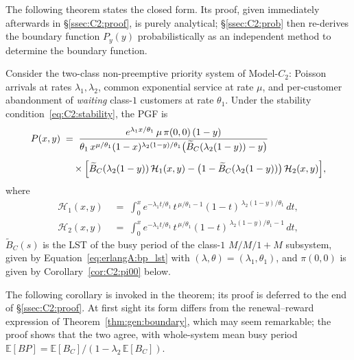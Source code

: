 The following theorem states the closed form. Its proof, given immediately afterwards in \S\ref{ssec:C2:proof}, is purely analytical; \S\ref{ssec:C2:prob} then re-derives the boundary function $P_y(y)$ probabilistically as an independent method to determine the boundary function.
\begin{theorem}\label{thm:C2:PGF}
    Consider the two-class non-preemptive priority system of Model-$C_2$: Poisson arrivals at rates $\lambda_1,\lambda_2$, common exponential service at rate $\mu$, and per-customer abandonment of \emph{waiting} class-$1$ customers at rate $\theta_1$. Under the stability condition~\eqref{eq:C2:stability}, the PGF is
    \begin{align*}
        \begin{split}
            P(x,y) \;&=\; \frac{e^{\lambda_1 x/\theta_1}\,\mu\,\pi(0,0)\,(1-y)}{\theta_1\, x^{\mu/\theta_1}(1-x)^{\lambda_2(1-y)/\theta_1}\bigl(\widetilde{B}_C(\lambda_2(1-y))-y\bigr)}\\[4pt]
            &\quad\times \Bigl[\widetilde{B}_C(\lambda_2(1-y))\,\mathcal{H}_1(x,y) - \bigl(1-\widetilde{B}_C(\lambda_2(1-y))\bigr)\,\mathcal{H}_2(x,y)\Bigr],
        \end{split}
    \end{align*}
    where
    \begin{align*}
        \mathcal{H}_1(x,y) &\;=\; \int_0^x e^{-\lambda_1 t/\theta_1}\,t^{\,\mu/\theta_1-1}(1-t)^{\,\lambda_2(1-y)/\theta_1}\,dt, \\
        \mathcal{H}_2(x,y) &\;=\; \int_0^x e^{-\lambda_1 t/\theta_1}\,t^{\,\mu/\theta_1}(1-t)^{\,\lambda_2(1-y)/\theta_1-1}\,dt,
    \end{align*}
    $\widetilde{B}_C(s)$ is the LST of the busy period of the class-$1$ $M/M/1{+}M$ subsystem, given by Equation~\eqref{eq:erlangA:bp_lst} with $(\lambda,\theta)=(\lambda_1,\theta_1)$, and $\pi(0,0)$ is given by Corollary~\ref{cor:C2:pi00} below.
\end{theorem}
The following corollary is invoked in the theorem; its proof is deferred to the end of \S\ref{ssec:C2:proof}. At first sight its form differs from the renewal--reward expression of Theorem~\ref{thm:gen:boundary}, which may seem remarkable; the proof shows that the two agree, with whole-system mean busy period $\mathbb{E}[BP]=\mathbb{E}[B_C]/(1-\lambda_2\,\mathbb{E}[B_C])$.
